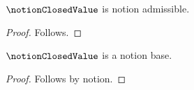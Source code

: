 

\begin{proposition}\label{notion_closed_value_imported_guard}
    $\notionClosedValue$ is notion admissible.
\end{proposition}
\begin{proof}
    Follows.
\end{proof}

\begin{proposition}\label{notion_closed_value_imported_replay}
    $\notionClosedValue$ is a notion base.
\end{proposition}
\begin{proof}
    Follows by notion.
\end{proof}
